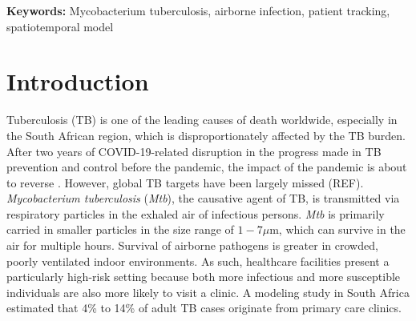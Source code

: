 \documentclass[fleqn,11pt]{wlscirep}
\begin{document}

\flushbottom
\maketitle
\setcounter{page}{1}
\thispagestyle{fancy}

\vspace{2em}


\vspace{0.5em}

\noindent\textbf{Keywords:} Mycobacterium tuberculosis, airborne infection, patient tracking, spatiotemporal model
\newpage

\sloppy
\raggedbottom

\newpage

\section{Introduction} 

Tuberculosis (TB) is one of the leading causes of death worldwide, especially in the South African region, which is disproportionately affected by the TB burden. After two years of COVID-19-related disruption in the progress made in TB prevention and control before the pandemic, the impact of the pandemic is about to reverse \cite{WHO2022TBReport}. However, global TB targets have 
been largely missed (REF).  \emph{Mycobacterium tuberculosis} (\emph{Mtb}), the causative agent of TB, is transmitted via respiratory particles in the exhaled air of infectious persons\cite{Rieder1999,Patterson2021Tuberculosis}. \emph{Mtb} is primarily carried in smaller particles in the size range of $1-7\mu$m\cite{Fennelly2020Lancet}, which can survive in the air for multiple hours\cite{Loudon1969AMRRD}. Survival of airborne pathogens is greater in crowded, poorly ventilated indoor environments\cite{Rieder1999,CPS2013Book,Nardell1991ARRD,Wang2021Science,Morawska2021}. As such, healthcare facilities present a particularly high-risk setting because both more infectious and more susceptible individuals are also more likely to visit a clinic\cite{McCreesh2020IJTLD}. A modeling study in South Africa estimated that 4\% to 14\% of adult TB cases originate from primary care clinics\cite{McCreesh2022BMJGlobalHealth}.
\end{document}
